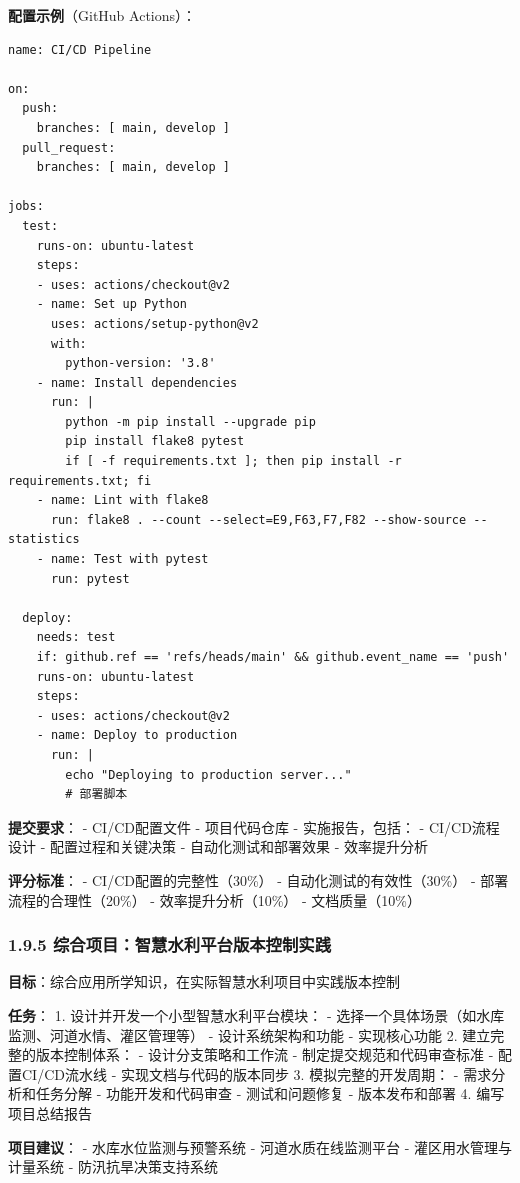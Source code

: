 \textbf{配置示例}（GitHub Actions）：

\begin{lstlisting}
name: CI/CD Pipeline

on:
  push:
    branches: [ main, develop ]
  pull_request:
    branches: [ main, develop ]

jobs:
  test:
    runs-on: ubuntu-latest
    steps:
    - uses: actions/checkout@v2
    - name: Set up Python
      uses: actions/setup-python@v2
      with:
        python-version: '3.8'
    - name: Install dependencies
      run: |
        python -m pip install --upgrade pip
        pip install flake8 pytest
        if [ -f requirements.txt ]; then pip install -r requirements.txt; fi
    - name: Lint with flake8
      run: flake8 . --count --select=E9,F63,F7,F82 --show-source --statistics
    - name: Test with pytest
      run: pytest

  deploy:
    needs: test
    if: github.ref == 'refs/heads/main' && github.event_name == 'push'
    runs-on: ubuntu-latest
    steps:
    - uses: actions/checkout@v2
    - name: Deploy to production
      run: |
        echo "Deploying to production server..."
        # 部署脚本
\end{lstlisting}

\textbf{提交要求}： - CI/CD配置文件 - 项目代码仓库 - 实施报告，包括： -
CI/CD流程设计 - 配置过程和关键决策 - 自动化测试和部署效果 - 效率提升分析

\textbf{评分标准}： - CI/CD配置的完整性（30\%） -
自动化测试的有效性（30\%） - 部署流程的合理性（20\%） -
效率提升分析（10\%） - 文档质量（10\%）

\subsubsection{1.9.5
综合项目：智慧水利平台版本控制实践}\label{ux7efcux5408ux9879ux76eeux667aux6167ux6c34ux5229ux5e73ux53f0ux7248ux672cux63a7ux5236ux5b9eux8df5}

\textbf{目标}：综合应用所学知识，在实际智慧水利项目中实践版本控制

\textbf{任务}： 1. 设计并开发一个小型智慧水利平台模块： -
选择一个具体场景（如水库监测、河道水情、灌区管理等） -
设计系统架构和功能 - 实现核心功能 2. 建立完整的版本控制体系： -
设计分支策略和工作流 - 制定提交规范和代码审查标准 - 配置CI/CD流水线 -
实现文档与代码的版本同步 3. 模拟完整的开发周期： - 需求分析和任务分解 -
功能开发和代码审查 - 测试和问题修复 - 版本发布和部署 4. 编写项目总结报告

\textbf{项目建议}： - 水库水位监测与预警系统 - 河道水质在线监测平台 -
灌区用水管理与计量系统 - 防汛抗旱决策支持系统

